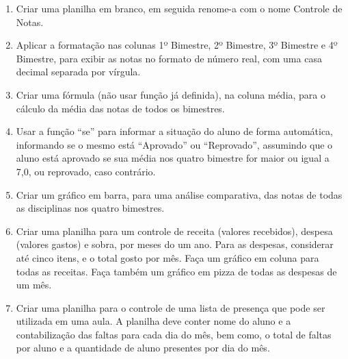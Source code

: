 \documentclass[11pt]{article}
\begin{document}
	\begin{enumerate}
		\item Criar uma planilha em branco, em seguida renome-a com o nome Controle de Notas.
		\item Aplicar a formatação nas colunas 1º Bimestre, 2º Bimestre, 3º Bimestre e 4º Bimestre, para exibir as notas no formato de número real, com uma casa decimal separada por vírgula.
		\item Criar uma fórmula (não usar função já definida), na coluna média, para o cálculo da média das notas de todos os bimestres.
		\item Usar a função “se” para informar a situação do aluno de forma automática, informando se o mesmo está “Aprovado” ou “Reprovado”, assumindo que o aluno está aprovado se sua média nos quatro bimestre for maior ou igual a 7,0, ou reprovado, caso contrário.
		\item Criar um gráfico em barra, para uma análise comparativa, das notas de todas as disciplinas nos quatro bimestres.
		\item Criar uma planilha para um controle de receita (valores recebidos), despesa (valores gastos) e sobra, por meses do um ano. Para as despesas, considerar até cinco itens, e o total gosto por mês. Fa\c ca um gráfico em coluna para todas as receitas. Fa\c ca também um gráfico em pizza de todas as despesas de um mês.
		\item Criar uma planilha para o controle de uma lista de presen\c ca que pode ser utilizada em uma aula. A planilha deve conter nome do aluno e a contabiliza\c cão das faltas para cada dia do mês, bem como, o total de faltas por aluno e a quantidade de aluno presentes por dia do mês.
	\end{enumerate}
\end{document}
